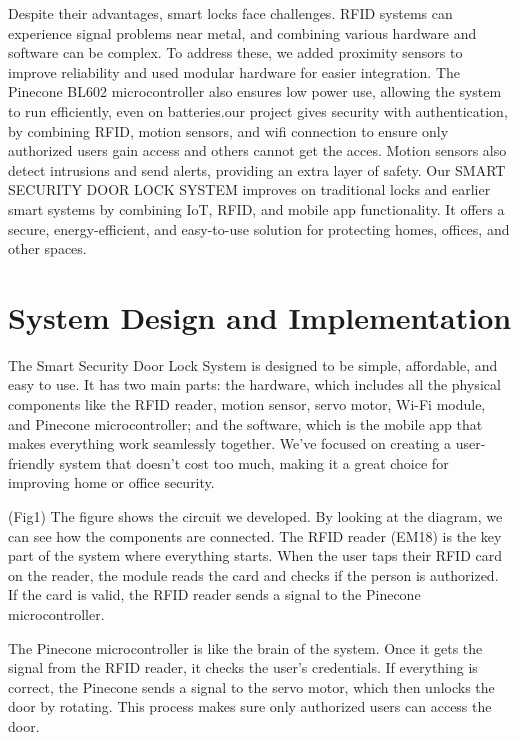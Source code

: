 \documentclass[USenglish,oneside,twocolumn]{article}
\begin{document}
Despite their advantages, smart locks face challenges. RFID systems can experience signal problems near metal, and combining various hardware and software can be complex. To address these, we added proximity sensors to improve reliability and used modular hardware for easier integration. The Pinecone BL602 microcontroller \cite{PINE64} also ensures low power use, allowing the system to run efficiently, even on batteries.our project gives security with authentication, by combining RFID, motion sensors, and wifi connection to ensure only authorized users gain access and others cannot get the acces. Motion sensors also detect intrusions and send alerts, providing an extra layer of safety. Our SMART SECURITY DOOR LOCK SYSTEM improves on traditional locks and earlier smart systems by combining IoT, RFID, and mobile app functionality. It offers a secure, energy-efficient, and easy-to-use solution for protecting homes, offices, and other spaces.

    

\section{System Design and Implementation}
\label{sec:System Design and Implementation}
The Smart Security Door Lock System is designed to be simple, affordable, and easy to use. It has two main parts: the hardware, which includes all the physical components like the RFID reader, motion sensor, servo motor, Wi-Fi module, and Pinecone microcontroller; and the software, which is the mobile app that makes everything work seamlessly together. We’ve focused on creating a user-friendly system that doesn’t cost too much, making it a great choice for improving home or office security.

(Fig1) The figure shows the circuit we developed. By looking at the diagram, we can see how the components are connected. The RFID reader (EM18) is the key part of the system where everything starts. When the user taps their RFID card on the reader, the module reads the card and checks if the person is authorized. If the card is valid, the RFID reader sends a signal to the Pinecone microcontroller.

The Pinecone microcontroller is like the brain of the system. Once it gets the signal from the RFID reader, it checks the user’s credentials. If everything is correct, the Pinecone sends a signal to the servo motor, which then unlocks the door by rotating. This process makes sure only authorized users can access the door.
\end{document}
